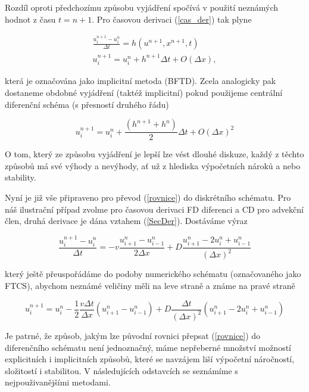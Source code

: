 Rozdíl oproti předchozímu způsobu vyjádření spočívá v použití neznámých hodnot z 
času $t = n+1$. Pro časovou derivaci (\ref{cas_der}) tak plyne

\begin{eqnarray}
\frac{u_{i}^{n+1}-u_{i}^n}{\Delta t} = h(u^{n+1}, x^{n+1}, t)
\\
u_{i}^{n+1} = u_{i}^n+h^{n+1}\Delta{t} + O(\Delta x),
\end{eqnarray}

která je označována jako implicitní metoda (BFTD). Zcela analogicky pak dostaneme 
obdobné vyjádření (taktéž implicitní) pokud použijeme centrální diferenční schéma 
(s přesností druhého řádu)

\begin{equation}
u_{i}^{n+1} = u_{i}^n + \frac{(h^{n+1} + h^{n})}{2} \Delta{t} + O(\Delta x)^2
\end{equation}

O tom, který ze způsobu vyjádření je lepší lze vést dlouhé diskuze, každý z těchto 
způsobů má své výhody a nevýhody, ať už z hlediska výpočetních nároků a nebo 
stability.

Nyní je již vše připraveno pro převod (\ref{rovnice}) do diskrétního schématu. Pro 
náš ilustrační případ zvolme pro časovou derivaci FD diferenci a CD pro advekční 
člen, druhá derivace je dána vztahem (\ref{SecDer}). Dostáváme výraz

\begin{equation}
     \frac{u_{i}^{n+1} - u_i^{n}}{\Delta t}
= - v \frac{u_{i+1}^n - u_{i-1}^n}{2\Delta x}
  + D \frac{u_{i+1}^n - 2 u_i^n+u_{i-1}^n}{(\Delta x)^2}
\end{equation}

který ještě přeuspořádáme do podoby numerického schématu (označovaného jako FTCS), 
abychom neznámé veličiny měli na leve straně a známe na pravé straně

\begin{equation}
u_{i}^{n+1} 
= u_i^{n} 
- \frac{1}{2} \frac{v \Delta t}{\Delta  x}(u_{i+1}^n - u_{i-1}^n)
+ D \frac{\Delta t}{(\Delta x)^2}(u_{i+1}^n - 2 u_{i}^{n} + u_{i-1}^n)
\label{simplefinal}
\end{equation}

Je patrné, že způsob, jakým lze původní rovnici přepsat (\ref{rovnice}) do 
diferenčního schématu není jednoznačný, máme nepřeberné množství možností 
explicitních i implicitních způsobů, které se navzájem liší výpočetní náročností, 
složitostí i stabilitou. V následujících odstavcích se seznámíme s 
nejpouživanějšími metodami.


